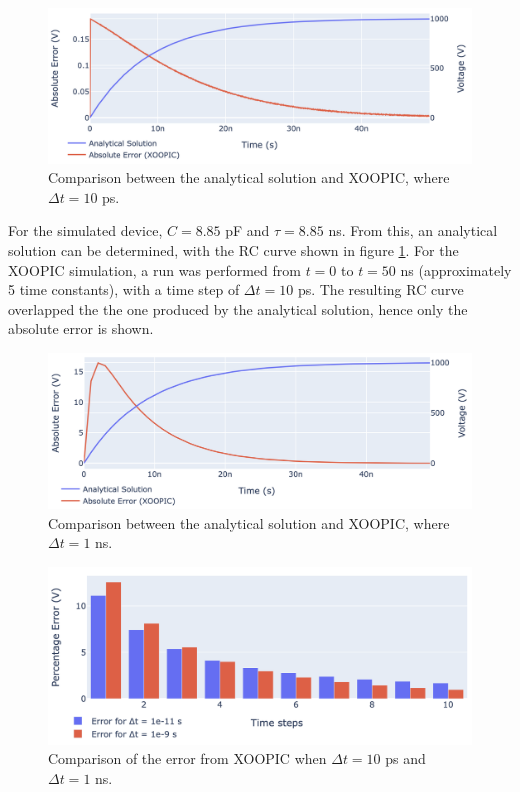 \begin{figure}[h!]
	\centering
	\includegraphics[width=\linewidth]{xoopic/figures/test_1_error.png}
	\caption{Comparison between the analytical solution and XOOPIC, where $\Delta t = 10$ ps.}
	\label{fig:test_1_error}
\end{figure} 

For the simulated device, $C = 8.85$ pF and $\tau = 8.85$ ns. From this, an analytical solution can be determined, with the RC curve shown in figure \ref{fig:test_1_error}. For the XOOPIC simulation, a run was performed from $t=0$ to $t=50$ ns (approximately 5 time constants), with a time step of $\Delta t = 10$ ps. The resulting RC curve overlapped the the one produced by the analytical solution, hence only the absolute error is shown. 

\begin{figure}[h!]
	\centering
	\includegraphics[width=\linewidth]{xoopic/figures/test_1_bigger_error.png}
	\caption{Comparison between the analytical solution and XOOPIC, where $\Delta t = 1$ ns.}
	\label{fig:test_1_bigger_error}
\end{figure}

\begin{figure}[h!]
	\centering
	\includegraphics[width=\linewidth]{xoopic/figures/test_1_error_comparison.png}
	\caption{Comparison of the error from XOOPIC when $\Delta t = 10$ ps and $\Delta t = 1$ ns.}
	\label{fig:test_1_error_comparison}
\end{figure} 

